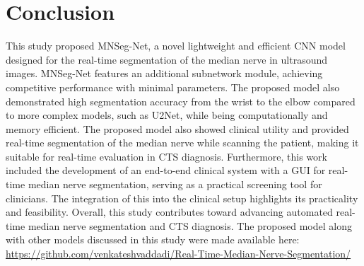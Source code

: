 
\section{Conclusion}
This study proposed MNSeg-Net, a novel lightweight and efficient CNN model designed for the real-time segmentation of the median nerve in ultrasound images. MNSeg-Net features an additional subnetwork module, achieving competitive performance with minimal parameters. The proposed model also demonstrated high segmentation accuracy from the wrist to the elbow compared to more complex models, such as U2Net, while being computationally and memory efficient. The proposed model also showed clinical utility and provided real-time segmentation of the median nerve while scanning the patient, making it suitable for real-time evaluation in CTS diagnosis. Furthermore, this work included the development of an end-to-end clinical system with a GUI for real-time median nerve segmentation, serving as a practical screening tool for clinicians. The integration of this into the clinical setup highlights its practicality and feasibility. Overall, this study contributes toward advancing automated real-time median nerve segmentation and CTS diagnosis. The proposed model along with other models discussed in this study were made available here: \href{https://github.com/venkateshvaddadi/Real-Time-Median-Nerve-Segmentation/}{https://github.com/venkateshvaddadi/Real-Time-Median-Nerve-Segmentation/}


